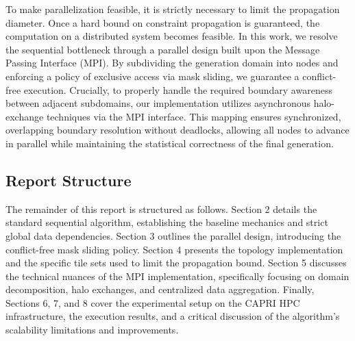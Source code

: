 To make parallelization feasible, it is strictly necessary to limit the propagation diameter. Once a hard bound on constraint propagation is guaranteed, the computation on a distributed system becomes feasible. In this work, we resolve the sequential bottleneck through a parallel design built upon the Message Passing Interface (MPI). By subdividing the generation domain into nodes and enforcing a policy of exclusive access via mask sliding, we guarantee a conflict-free execution. Crucially, to properly handle the required boundary awareness between adjacent subdomains, our implementation utilizes asynchronous halo-exchange techniques via the MPI interface. This mapping ensures synchronized, overlapping boundary resolution without deadlocks, allowing all nodes to advance in parallel while maintaining the statistical correctness of the final generation.

\subsection{Report Structure}

The remainder of this report is structured as follows. Section 2 details the standard sequential algorithm, establishing the baseline mechanics and strict global data dependencies. Section 3 outlines the parallel design, introducing the conflict-free mask sliding policy. Section 4 presents the topology implementation and the specific tile sets used to limit the propagation bound. Section 5 discusses the technical nuances of the MPI implementation, specifically focusing on domain decomposition, halo exchanges, and centralized data aggregation. Finally, Sections 6, 7, and 8 cover the experimental setup on the CAPRI HPC infrastructure, the execution results, and a critical discussion of the algorithm's scalability limitations and improvements.